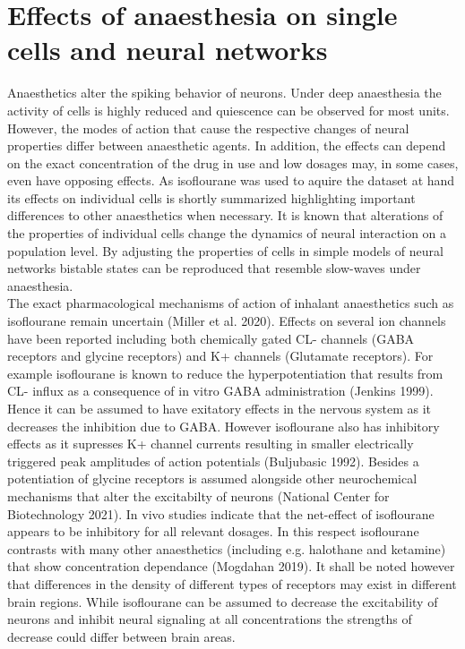 \section{Effects of anaesthesia on single cells and neural networks}
Anaesthetics alter the spiking behavior of neurons. Under deep anaesthesia the activity of cells is highly reduced and quiescence can be observed for most units. However, the modes of action that cause the respective changes of neural properties differ between anaesthetic agents. In addition, the effects can depend on the exact concentration of the drug in use and low dosages may, in some cases, even have opposing effects. As isoflourane was used to aquire the dataset at hand its effects on individual cells is shortly summarized highlighting important differences to other anaesthetics when necessary. It is known that alterations of the properties of individual cells change the dynamics of neural interaction on a population level. By adjusting the properties of cells in simple models of neural networks bistable states can be reproduced that resemble slow-waves under anaesthesia.\\
The exact pharmacological mechanisms of action of inhalant anaesthetics such as isoflourane remain uncertain (Miller et al. 2020). Effects on several ion channels have been reported including both chemically gated CL- channels (GABA receptors and glycine receptors) and K+ channels (Glutamate receptors). For example isoflourane is known to reduce the hyperpotentiation that results from CL- influx as a consequence of in vitro GABA administration (Jenkins 1999). Hence it can be assumed to have exitatory effects  in the nervous system as it decreases the inhibition due to GABA. However isoflourane also has inhibitory effects as it supresses K+ channel currents resulting in smaller electrically triggered peak amplitudes of action potentials (Buljubasic 1992). Besides a potentiation of glycine receptors is assumed alongside other neurochemical mechanisms that alter the excitabilty of neurons (National Center for Biotechnology 2021). In vivo studies indicate that the net-effect of isoflourane appears to be inhibitory for all relevant dosages. In this respect isoflourane contrasts with many other anaesthetics (including e.g. halothane and ketamine) that show concentration dependance (Mogdahan 2019). It shall be noted however that differences in the density of different types of receptors may exist  in different brain regions. While isoflourane can be assumed to decrease the excitability of neurons and inhibit neural signaling at all concentrations the strengths of decrease could differ between brain areas.\\
